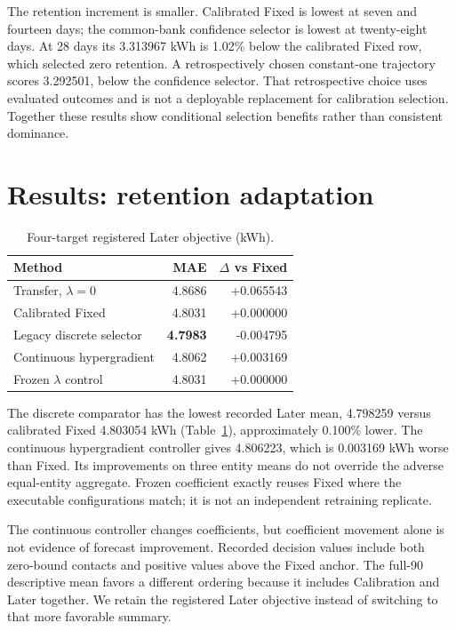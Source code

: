 \documentclass[pdflatex,iicol,sn-mathphys-num]{sn-jnl}
\begin{document}
The retention increment is smaller. Calibrated Fixed is lowest at seven and fourteen days; the common-bank confidence selector is lowest at twenty-eight days. At 28 days its 3.313967 kWh is 1.02\% below the calibrated Fixed row, which selected zero retention. A retrospectively chosen constant-one trajectory scores 3.292501, below the confidence selector. That retrospective choice uses evaluated outcomes and is not a deployable replacement for calibration selection. Together these results show conditional selection benefits rather than consistent dominance.

\section{Results: retention adaptation}
\begin{table}[t]
\centering\small
\caption{Four-target registered Later objective (kWh).}\label{tab:later}
\begin{tabularx}{\columnwidth}{@{}Xrr@{}}\toprule
Method & MAE & $\Delta$ vs Fixed\\\midrule
Transfer, $\lambda=0$ & 4.8686 & +0.065543\\
Calibrated Fixed & 4.8031 & +0.000000\\
Legacy discrete selector & \textbf{4.7983} & -0.004795\\
Continuous hypergradient & 4.8062 & +0.003169\\
Frozen $\lambda$ control & 4.8031 & +0.000000\\
\bottomrule\end{tabularx}
\end{table}

The discrete comparator has the lowest recorded Later mean, 4.798259 versus calibrated Fixed 4.803054 kWh (Table~\ref{tab:later}), approximately 0.100\% lower. The continuous hypergradient controller gives 4.806223, which is 0.003169 kWh worse than Fixed. Its improvements on three entity means do not override the adverse equal-entity aggregate. Frozen coefficient exactly reuses Fixed where the executable configurations match; it is not an independent retraining replicate.

The continuous controller changes coefficients, but coefficient movement alone is not evidence of forecast improvement. Recorded decision values include both zero-bound contacts and positive values above the Fixed anchor. The full-90 descriptive mean favors a different ordering because it includes Calibration and Later together. We retain the registered Later objective instead of switching to that more favorable summary.
\end{document}
